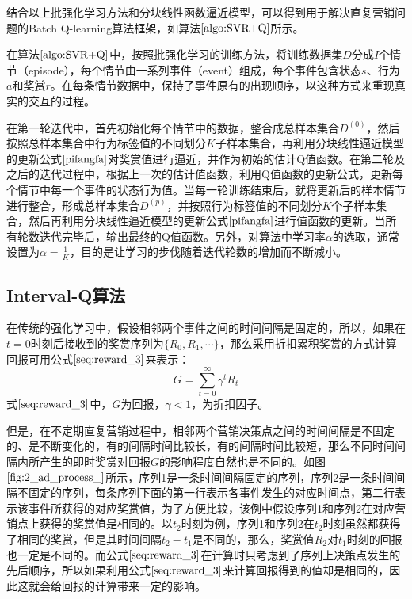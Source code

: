 结合以上批强化学习方法和分块线性函数逼近模型，可以得到用于解决直复营销问题的Batch Q-learning算法框架，如算法$\ref{algo:SVR+Q}$所示。

在算法$\ref{algo:SVR+Q}$中，按照批强化学习的训练方法，将训练数据集$D$分成$I$个情节（episode），每个情节由一系列事件（event）组成，每个事件包含状态$s$、行为$a$和奖赏$r$。在每条情节数据中，保持了事件原有的出现顺序，以这种方式来重现真实的交互的过程。

在第一轮迭代中，首先初始化每个情节中的数据，整合成总样本集合$D^{(0)}$，然后按照总样本集合中行为标签值的不同划分$K$子样本集合，再利用分块线性逼近模型的更新公式$\eqref{pifangfa}$对奖赏值进行逼近，并作为初始的估计Q值函数。在第二轮及之后的迭代过程中，根据上一次的估计值函数，利用Q值函数的更新公式，更新每个情节中每一个事件的状态行为值。当每一轮训练结束后，就将更新后的样本情节进行整合，形成总样本集合$D^{(p)}$，并按照行为标签值的不同划分$K$个子样本集合，然后再利用分块线性逼近模型的更新公式$\eqref{pifangfa}$进行值函数的更新。当所有轮数迭代完毕后，输出最终的Q值函数。另外，对算法中学习率$\alpha$的选取，通常设置为$\alpha=\frac{1}{K}$，目的是让学习的步伐随着迭代轮数的增加而不断减小。

\subsection{Interval-Q算法}
在传统的强化学习中，假设相邻两个事件之间的时间间隔是固定的，所以，如果在$t=0$时刻后接收到的奖赏序列为$\{R_{0}, R_{1},\cdots\}$，那么采用折扣累积奖赏的方式计算回报可用公式$\eqref{seq:reward_3}$来表示：
\begin{equation}\label{seq:reward_3}
G=\sum_{t=0}^{\infty}\gamma^{t}R_{t}
\end{equation}
式$\eqref{seq:reward_3}$中，$G$为回报，$\gamma<1$，为折扣因子。

但是，在不定期直复营销过程中，相邻两个营销决策点之间的时间间隔是不固定的、是不断变化的，有的间隔时间比较长，有的间隔时间比较短，那么不同时间间隔内所产生的即时奖赏对回报$G$的影响程度自然也是不同的。如图$\ref{fig:2_ad_process_}$所示，序列1是一条时间间隔固定的序列，序列2是一条时间间隔不固定的序列，每条序列下面的第一行表示各事件发生的对应时间点，第二行表示该事件所获得的对应奖赏值，为了方便比较，该例中假设序列1和序列2在对应营销点上获得的奖赏值是相同的。以$t_{2}$时刻为例，序列1和序列2在$t_{2}$时刻虽然都获得了相同的奖赏，但是其时间间隔$t_{2}-t_{1}$是不同的，那么，奖赏值$R_{2}$对$t_{1}$时刻的回报也一定是不同的。而公式$\eqref{seq:reward_3}$在计算时只考虑到了序列上决策点发生的先后顺序，所以如果利用公式$\eqref{seq:reward_3}$来计算回报得到的值却是相同的，因此这就会给回报的计算带来一定的影响。

